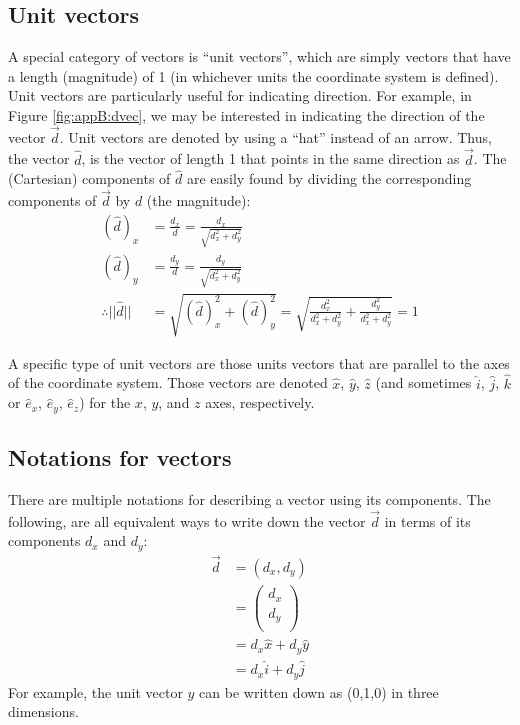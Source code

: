 \subsection{Unit vectors} 
A special category of vectors is ``unit vectors'', which are simply vectors that have a length (magnitude) of 1 (in whichever units the coordinate system is defined). Unit vectors are particularly useful for indicating direction. For example, in Figure \ref{fig:appB:dvec}, we may be interested in indicating the direction of the vector $\vec d$. Unit vectors are denoted by using a ``hat'' instead of an arrow. Thus, the vector $\hat d$, is the vector of length 1 that points in the same direction as $\vec d$. The (Cartesian) components of $\hat d$ are easily found by dividing the corresponding components of $\vec d$ by $d$ (the magnitude):
\begin{align*}
(\hat d)_x &= \frac{d_x}{d}=\frac{d_x}{\sqrt{d_x^2+d_y^2}}\\
(\hat d)_y &= \frac{d_y}{d}=\frac{d_y}{\sqrt{d_x^2+d_y^2}}\\
\therefore ||\hat d||&=\sqrt{(\hat d)_x^2+(\hat d)_y^2}=\sqrt{\frac{d_x^2}{d_x^2+d_y^2}+\frac{d_y^2}{d_x^2+d_y^2}}=1
\end{align*}

A specific type of unit vectors are those units vectors that are parallel to the axes of the coordinate system. Those vectors are denoted $\hat x$, $\hat y$, $\hat z$ (and sometimes $\hat i$, $\hat j$, $\hat k$ or $\hat e_x$, $\hat e_y$, $\hat e_z$) for the $x$, $y$, and $z$ axes, respectively. 

\subsection{Notations for vectors}
There are multiple notations for describing a vector using its components. The following, are all equivalent ways to write down the vector $\vec d$ in terms of its components $d_x$ and $d_y$:
\begin{align*}
\vec d &= (d_x,d_y)\\
       &=\begin{pmatrix}
           d_x \\
           d_y \\
         \end{pmatrix}\\
         &= d_x\hat x +d_y \hat y\\
         &=d_x\hat i +d_y \hat j 
\end{align*}
For example, the unit vector $\hat y$ can be written down as (0,1,0) in three dimensions. 

